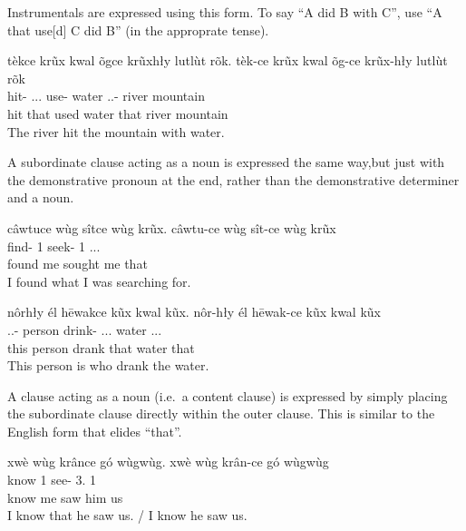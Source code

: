 Instrumentals are expressed using this form.
To say ``A did B with C'',
use ``A that use[d] C did B'' (in the approprate tense).

\begin{exe}
    \ex
    \glt
    tèkce krũx kwal õgce krũxhły lutlùt rõk.
    \glll
    tèk-ce krũx kwal õg-ce krũx-hły lutlùt rõk \\
    hit-\Pst{} \Dem{}.\Dist{}.\Inanim{}.\Sg{} use-\Pst{} water \Dem{}.\Dist{}.\Inanim{}-\Adj{} river mountain \\
    hit that used water that river mountain \\
    \glt
    The river hit the mountain with water.
\end{exe}

A subordinate clause acting as a noun
is expressed the same way,but just with the demonstrative pronoun
at the end, rather than the demonstrative determiner and a noun.

\begin{exe}
    \ex
    câwtuce wùg sîtce wùg krũx.
    \glll
    câwtu-ce wùg sît-ce wùg krũx \\
    find-\Pst{} 1\Sg{} seek-\Pst{} 1\Sg{} \Dem{}.\Inanim{}.\Dist{}.\Sg{} \\
    found me sought me that  \\
    \glt
    I found what I was searching for.
\end{exe}

\begin{exe}
    \ex
    nôrhły él hēwakce kũx kwal kũx.
    \glll
    nôr-hły él hēwak-ce kũx kwal kũx \\
    \Dem{}.\Anim{}.\Prox{}-\Adj{} person drink-\Pst{} \Dem{}.\Anim{}.\Dist{}.\Sg{} water \Dem{}.\Anim{}.\Dist{}.\Sg{} \\
    this person drank that water that \\
    \glt
    This person is who drank the water.
\end{exe}

A clause acting as a noun (i.e.\ a content clause)
is expressed by simply placing the subordinate clause directly within the outer clause.
This is similar to the English form that elides ``that''.

\begin{exe}
    \ex
    \glt
    xwè wùg krânce gó wùgwùg.
    \glll
    xwè wùg krân-ce gó wùgwùg \\
    know 1\Sg{} see-\Pst{} 3\Sg{}.\Anim{} 1\Pl{} \\
    know me saw him us \\
    \glt
    I know that he saw us.
    /
    I know he saw us.
\end{exe}

